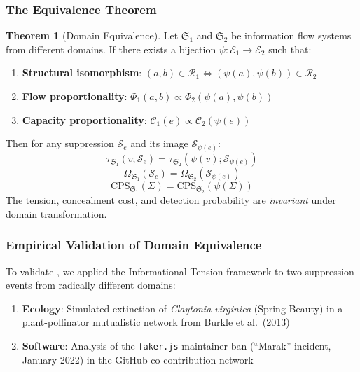 \documentclass[12pt,a4paper]{article}
\theoremstyle{definition}
\newtheorem{theorem}{Theorem}[section]
\theoremstyle{remark}
\begin{document}
\subsubsection{The Equivalence Theorem}

\begin{theorem}[Domain Equivalence]
\label{thm:domain-equiv}
Let $\mathfrak{S}_1$ and $\mathfrak{S}_2$ be information flow systems from different domains. If there exists a bijection $\psi: \mathcal{E}_1 \to \mathcal{E}_2$ such that:
\begin{enumerate}
    \item \textbf{Structural isomorphism}: $(a, b) \in \mathcal{R}_1 \Leftrightarrow (\psi(a), \psi(b)) \in \mathcal{R}_2$
    \item \textbf{Flow proportionality}: $\Phi_1(a, b) \propto \Phi_2(\psi(a), \psi(b))$
    \item \textbf{Capacity proportionality}: $\mathcal{C}_1(e) \propto \mathcal{C}_2(\psi(e))$
\end{enumerate}
Then for any suppression $\mathcal{S}_e$ and its image $\mathcal{S}_{\psi(e)}$:
\begin{equation}
    \boxed{
    \tau_{\mathfrak{S}_1}(v; \mathcal{S}_e) = \tau_{\mathfrak{S}_2}(\psi(v); \mathcal{S}_{\psi(e)})
    }
\end{equation}
\begin{equation}
    \boxed{
    \Omega_{\mathfrak{S}_1}(\mathcal{S}_e) = \Omega_{\mathfrak{S}_2}(\mathcal{S}_{\psi(e)})
    }
\end{equation}
\begin{equation}
    \boxed{
    \text{CPS}_{\mathfrak{S}_1}(\Sigma) = \text{CPS}_{\mathfrak{S}_2}(\psi(\Sigma))
    }
\end{equation}
The tension, concealment cost, and detection probability are \emph{invariant} under domain transformation.
\end{theorem}

\subsubsection{Empirical Validation of Domain Equivalence}

To validate , we applied the Informational Tension framework to two suppression events from radically different domains:

\begin{enumerate}
    \item \textbf{Ecology}: Simulated extinction of \textit{Claytonia virginica} (Spring Beauty) in a plant-pollinator mutualistic network from Burkle et al.\ (2013)
    \item \textbf{Software}: Analysis of the \texttt{faker.js} maintainer ban (``Marak'' incident, January 2022) in the GitHub co-contribution network
\end{enumerate}
\end{document}
